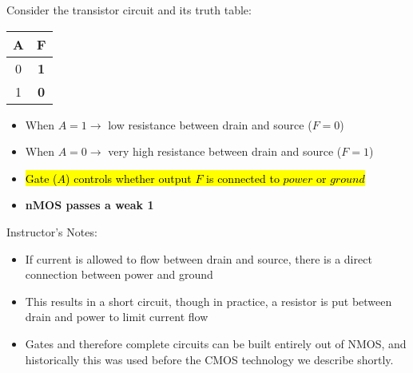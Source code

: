 \begin{frame}[fragile]
\begin{tcolorbox}[enhanced,attach boxed title to top center={yshift=-3mm,yshifttext=-1mm},
  colback=blue!5!white,colframe=blue!75!black,colbacktitle=blue!80!black,
  title=Think About It,fonttitle=\bfseries,
  boxed title style={size=small,colframe=red!50!black} ]
  Consider the transistor circuit and its truth table:
  \begin{multicols}{2}
  \columnbreak
  \begin{center}
      \begin{tabular}{c|c}
          A & F \\
          \hline
           0 & \textbf{1}\\
           1 & \textbf{0}\\
           \hline
      \end{tabular}
  \end{center}  
  \end{multicols}
  {\footnotesize
  \begin{itemize}
  \item When $A=1 \rightarrow$ low resistance between	drain and source ($F=0$)
  \item When $A=0 \rightarrow$ very high resistance between drain and source ($F=1$)
  \item \hl{Gate ($A$) controls whether output $F$ is connected to $power$ or $ground$}
  \item \textbf{nMOS passes a {\color{gray}weak 1}}
  \end{itemize}
  }
\end{tcolorbox}
\end{frame}
\BNotes\ifnum{}
\begin{frame}[fragile]
Instructor's Notes:
\begin{itemize}
\item If current is allowed to flow between drain and source, there is a direct connection between power and ground
\item This results in a short circuit, though in practice, a resistor is put between drain and power to limit current flow
\item Gates and therefore complete circuits can be built entirely out of NMOS, and historically this was used before the CMOS technology we describe shortly.
\end{itemize}
\end{frame}
\fi\ENotes


